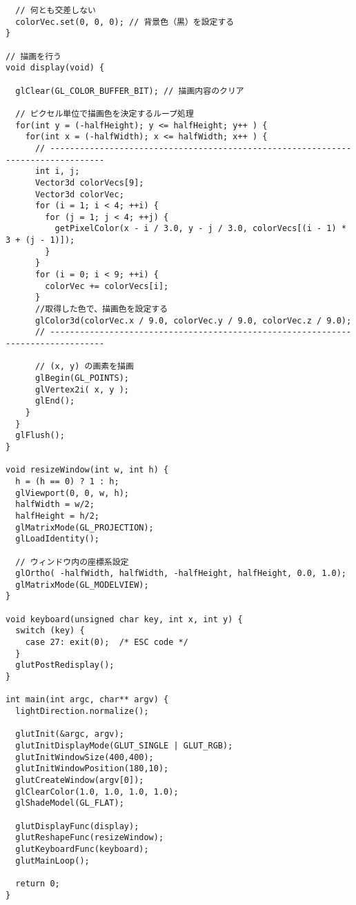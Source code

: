 \documentclass{scrartcl}
\begin{document}
\begin{verbatim}
  // 何とも交差しない
  colorVec.set(0, 0, 0); // 背景色（黒）を設定する
}

// 描画を行う
void display(void) {

  glClear(GL_COLOR_BUFFER_BIT); // 描画内容のクリア

  // ピクセル単位で描画色を決定するループ処理
  for(int y = (-halfHeight); y <= halfHeight; y++ ) {
    for(int x = (-halfWidth); x <= halfWidth; x++ ) {
      // ---------------------------------------------------------------------------------
      int i, j;
      Vector3d colorVecs[9];
      Vector3d colorVec;
      for (i = 1; i < 4; ++i) {
        for (j = 1; j < 4; ++j) {
          getPixelColor(x - i / 3.0, y - j / 3.0, colorVecs[(i - 1) * 3 + (j - 1)]);
        }
      }
      for (i = 0; i < 9; ++i) {
        colorVec += colorVecs[i];
      }
      //取得した色で、描画色を設定する
      glColor3d(colorVec.x / 9.0, colorVec.y / 9.0, colorVec.z / 9.0);
      // ---------------------------------------------------------------------------------

      // (x, y) の画素を描画
      glBegin(GL_POINTS);
      glVertex2i( x, y );
      glEnd();
    }
  }
  glFlush();
}

void resizeWindow(int w, int h) {
  h = (h == 0) ? 1 : h;
  glViewport(0, 0, w, h);
  halfWidth = w/2;
  halfHeight = h/2;
  glMatrixMode(GL_PROJECTION);
  glLoadIdentity();

  // ウィンドウ内の座標系設定
  glOrtho( -halfWidth, halfWidth, -halfHeight, halfHeight, 0.0, 1.0);
  glMatrixMode(GL_MODELVIEW);
}

void keyboard(unsigned char key, int x, int y) {
  switch (key) {
    case 27: exit(0);  /* ESC code */
  }
  glutPostRedisplay();
}

int main(int argc, char** argv) {
  lightDirection.normalize();

  glutInit(&argc, argv);
  glutInitDisplayMode(GLUT_SINGLE | GLUT_RGB);
  glutInitWindowSize(400,400);
  glutInitWindowPosition(180,10);
  glutCreateWindow(argv[0]);
  glClearColor(1.0, 1.0, 1.0, 1.0);
  glShadeModel(GL_FLAT);

  glutDisplayFunc(display);
  glutReshapeFunc(resizeWindow);
  glutKeyboardFunc(keyboard);
  glutMainLoop();

  return 0;
}
\end{verbatim}
\end{document}
